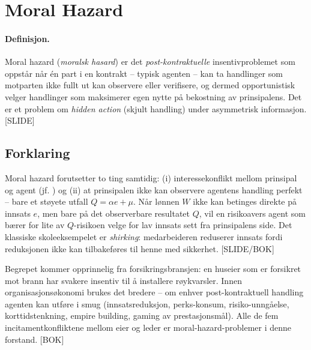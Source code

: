 \section{Moral Hazard}\label{thr:moral-hazard}

\paragraph{Definisjon.} Moral hazard (\emph{moralsk hasard}) er det \emph{post-kontraktuelle} insentivproblemet som oppstår når én part i en kontrakt -- typisk agenten -- kan ta handlinger som motparten ikke fullt ut kan observere eller verifisere, og dermed opportunistisk velger handlinger som maksimerer egen nytte på bekostning av prinsipalens. Det er et problem om \emph{hidden action} (skjult handling) under asymmetrisk informasjon. [SLIDE]

\subsection*{Forklaring}

Moral hazard forutsetter to ting samtidig: (i) interessekonflikt mellom prinsipal og agent (jf. ) og (ii) at prinsipalen ikke kan observere agentens handling perfekt -- bare et støyete utfall $Q = \alpha e + \mu$. Når lønnen $W$ ikke kan betinges direkte på innsats $e$, men bare på det observerbare resultatet $Q$, vil en risikoavers agent som bærer for lite av $Q$-risikoen velge for lav innsats sett fra prinsipalens side. Det klassiske skole\-eksempelet er \emph{shirking}: medarbeideren reduserer innsats fordi reduksjonen ikke kan tilbakeføres til henne med sikkerhet. [SLIDE/BOK]

Begrepet kommer opprinnelig fra forsikringsbransjen: en huseier som er forsikret mot brann har svakere insentiv til å installere røykvarsler. Innen organisasjonsøkonomi brukes det bredere -- om enhver post-kontraktuell handling agenten kan utføre i smug (innsatsreduksjon, perks-konsum, risiko-unngåelse, korttidstenkning, empire building, gaming av prestasjonsmål). Alle de fem incitamentkonfliktene mellom eier og leder er moral-hazard-problemer i denne forstand. [BOK]

